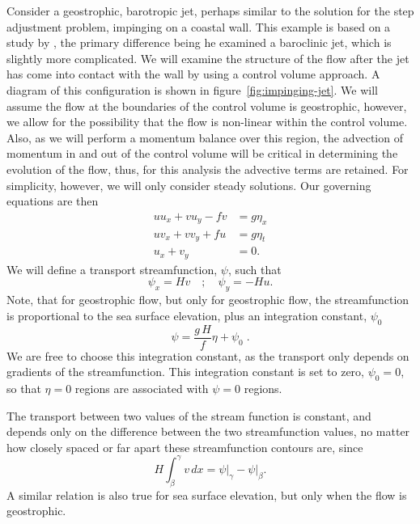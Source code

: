 \documentclass[11pt]{report}
\numberwithin{equation}{section}
\begin{document}
Consider a geostrophic, barotropic jet, perhaps similar to the solution for the step adjustment problem, impinging on a coastal wall.  This example is based on a study by \citet{whitehead:85}, the primary difference being he examined a baroclinic jet, which is slightly more complicated.  We will examine the structure of the flow after the jet has come into contact with the wall by using a control volume approach.  A diagram of this configuration is shown in figure~\ref{fig:impinging-jet}.  We will assume the flow at the boundaries of the control volume is geostrophic, however, we allow for the possibility that the flow is non-linear within the control volume.  Also, as we will perform a momentum balance over this region, the advection of momentum in and out of the control volume will be critical in determining the evolution of the flow, thus, for this analysis the advective terms are retained.  For simplicity, however, we will only consider steady solutions.  Our governing equations are then
\begin{align}
    u u_x + v u_y - f v &= g \eta_x \label{eq:jet-u}\\
    u v_x + v v_y + f u &= g \eta_t \label{eq:jet-v}\\
    u_x + v_y &= 0. \label{eq:jet-continuity}
\end{align}
We will define a transport streamfunction, $\psi$, such that
\begin{equation}
    \psi_x = H v \quad ; \quad \psi_y = - H u.
\end{equation}
Note, that for geostrophic flow, but only for geostrophic flow, the streamfunction is proportional to the sea surface elevation, plus an integration constant, $\psi_0$
\begin{equation}
    \label{eq:eta_psi}
    \psi = \frac{g\,H}{f}\eta + \psi_0 \; .
\end{equation}
We are free to choose this integration constant, as the transport only depends on gradients of the streamfunction.  This integration constant is set to zero, $\psi_0 = 0$, so that $\eta=0$ regions are associated with $\psi=0$ regions.

The transport between two values of the stream function is constant, and depends only on the difference between the two streamfunction values, no matter how closely spaced or far apart these streamfunction contours are, since
\begin{equation}
    H \int_{\beta}^{\gamma} v\, dx = \psi\bigg|_{\gamma} - \psi\bigg|_{\beta}.
\end{equation}
A similar relation is also true for sea surface elevation, but only when the flow is geostrophic.
\end{document}
